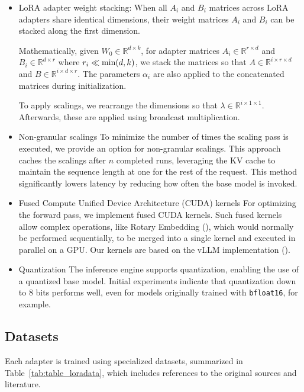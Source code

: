 \begin{itemize}
    \item LoRA adapter weight stacking: When all $A_i$ and $B_i$ matrices across LoRA adapters share identical dimensions, their weight matrices $A_i$ and $B_i$ can be stacked along the first dimension.

Mathematically, given $W_0 \in \mathbb{R}^{d \times k}$, for adapter matrices $A_i \in \mathbb{R}^{r \times d}$ and $B_i \in \mathbb{R}^{d \times r}$ where $r_i \ll {\rm min} (d,k)$, we stack the matrices so that $A \in \mathbb{R}^{i \times r \times d}$ and $B \in \mathbb{R}^{i \times d \times r}$. The parameters $\alpha_i$ are also applied to the concatenated matrices during initialization.

To apply scalings, we rearrange the dimensions so that $\lambda \in \mathbb{R}^{i \times 1 \times 1}$. Afterwards, these are applied using broadcast multiplication.

\item Non-granular scalings To minimize the number of times the scaling pass is executed, we provide an option for non-granular scalings. This approach caches the scalings after $n$ completed runs, leveraging the KV cache to maintain the sequence length at one for the rest of the request. This method significantly lowers latency by reducing how often the base model is invoked.

\item Fused Compute Unified Device Architecture (CUDA) kernels For optimizing the forward pass, we implement fused CUDA kernels. Such fused kernels allow complex operations, like Rotary Embedding (\cite{su2021roformer}), which would normally be performed sequentially, to be merged into a single kernel and executed in parallel on a GPU. Our kernels are based on the vLLM implementation (\cite{kwon2023efficient}).

\item Quantization The inference engine supports quantization, enabling the use of a quantized base model. Initial experiments indicate that quantization down to 8 bits performs well, even for models originally trained with \texttt{bfloat16}, for example.

\end{itemize}

\subsection{Datasets}

Each adapter is trained using specialized datasets, summarized in Table~\ref{tab:table_loradata}, which includes references to the original sources and literature.

